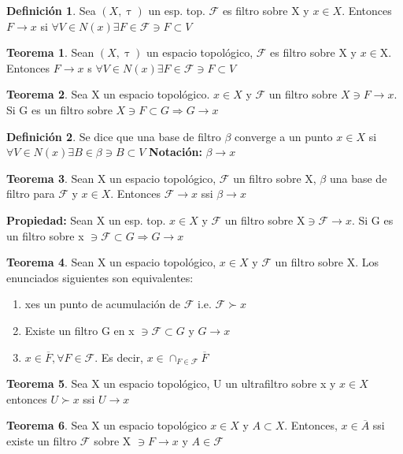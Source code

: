 \documentclass{article}
\theoremstyle{definition}
\newtheorem{definition}{Definición}[section]
\newtheorem{theorem}{Teorema}[section]
\begin{document}
\begin{definition}
	Sea $(X,\uptau)$ un esp. top. $\mathcal{F}$ es filtro sobre X y $x\in X$. Entonces $F\to x$ si $\forall V\in N(x)\exists F\in\mathcal{F}\ni F\subset V$
\end{definition}
\begin{theorem}
	Sean $(X,\uptau)$ un espacio topológico, $\mathcal{F}$ es filtro sobre X y $x\in$X. Entonces $F\to x$ s $\forall V\in N(x)\exists F\in\mathcal{F}\ni F\subset V$
\end{theorem}
\begin{theorem}
	Sea X un espacio topológico. $x\in X$ y $\mathcal{F}$ un filtro sobre $X\ni F\to x$. Si G es un filtro sobre $X\ni F\subset G\Rightarrow G\to x$
\end{theorem}
\begin{definition}
	Se dice que una base de filtro $\beta$ converge a un punto $x\in X$ si $\forall V\in N(x)\exists B\in\beta\ni B\subset V$
	\textbf{Notación: } $\beta\to x$
\end{definition}
\begin{theorem}
	Sean X un espacio topológico, $\mathcal{F}$ un filtro sobre X, $\beta$ una base de filtro para $\mathcal{F}$ y $x\in X$. Entonces $\mathcal{F}\to x$ ssi $\beta \to x$
\end{theorem}
\textbf{Propiedad: }
Sean X un esp. top. $x\in X$ y $\mathcal{F}$ un filtro sobre X$\ni \mathcal{F}\to x$. Si G es un filtro sobre x $\ni \mathcal{F}\subset G\Rightarrow G\to x$
\begin{theorem}
	Sean X un espacio topológico, $x\in X$ y $\mathcal{F}$ un filtro sobre X. Los enunciados siguientes son equivalentes:
	\begin{enumerate}
		\item xes un punto de acumulación de $\mathcal{F}$ i.e. $\mathcal{F} \succ x$
		\item Existe un filtro G en x $\ni\mathcal{F}\subset G$ y $G\to x$
		\item $x\in \overline{F}, \forall F \in \mathcal{F}$. Es decir, $x\in \cap_{F\in\mathcal{F}}\overline{F}$ 
	\end{enumerate}
\end{theorem}
\begin{theorem}
	Sea X un espacio topológico, U un ultrafiltro sobre x y $x\in X$ entonces $U \succ x$ ssi $U\to x$
\end{theorem}
\begin{theorem}
	Sea X un espacio topológico $x\in X$ y $A\subset X$. Entonces, $x\in\overline{A}$ ssi existe un filtro $\mathcal{F}$ sobre X $\ni F\to x$ y $A\in\mathcal{F}$
\end{theorem}
\end{document}
